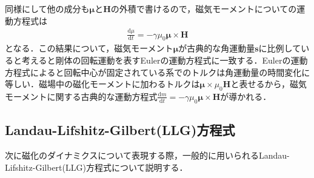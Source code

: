 同様にして他の成分も$\bm{\mu}$と$\bm{H}$の外積で書けるので，磁気モーメントについての運動方程式は
\begin{eqnarray}
\frac{\mathrm{d}\mu}{\mathrm{d}t}=-\gamma\mu_{0}\bm{\mu}\times\bm{H}
\label{eq:mueq}
\end{eqnarray}
となる．この結果について，磁気モーメント$\bm{\mu}$が古典的な角運動量$\bm{s}$に比例していると考えると剛体の回転運動を表すEulerの運動方程式に一致する．Eulerの運動方程式によると回転中心が固定されている系でのトルクは角運動量の時間変化に等しい．磁場中の磁化モーメントに加わるトルクは$\bm{\mu}\times\mu_{0}\bm{H}$と表せるから，磁気モーメントに関する古典的な運動方程式$\frac{\mathrm{d}m}{\mathrm{d}t}=-\gamma\mu_{0}\bm{\mu}\times\bm{H}$が導かれる．
\subsection{Landau-Lifshitz-Gilbert(LLG)方程式}
次に磁化のダイナミクスについて表現する際，一般的に用いられるLandau-Lifshitz-Gilbert(LLG)方程式について説明する．\\

